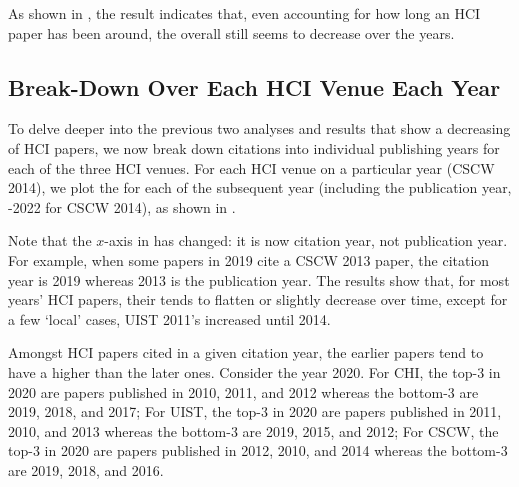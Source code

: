 As shown in , the result indicates that, even accounting for how long an HCI paper has been around, the overall \xin still seems to decrease over the years.


\subsection{\xin Break-Down Over Each HCI Venue Each Year}

To delve deeper into the previous two analyses and results that show a decreasing \xin of HCI papers, 
we now break down citations into individual publishing years for each of the three HCI venues.
For each HCI venue on a particular year (\eg CSCW 2014), we plot the \xin for each of the subsequent year (including the publication year, -2022 for CSCW 2014), as shown in .

Note that the $x$-axis in  has changed: it is now citation year, not publication year. For example, when some papers in 2019 cite a CSCW 2013 paper, the citation year is 2019 whereas 2013 is the publication year.
The results show that, for most years' HCI papers, their \xin tends to flatten or slightly decrease over time, except for a few `local' cases, \eg UIST 2011's \xin increased until 2014.

Amongst HCI papers cited in a given citation year, the earlier papers tend to have a higher \xin than the later ones. 
Consider the year 2020. 
For CHI, the top-3 \xin in 2020 are papers published in 2010, 2011, and 2012 whereas the bottom-3 are 2019, 2018, and 2017;
For UIST, the top-3 \xin in 2020 are papers published in 2011, 2010, and 2013 whereas the bottom-3 are 2019, 2015, and 2012;
For CSCW, the top-3 \xin in 2020 are papers published in 2012, 2010, and 2014 whereas the bottom-3 are 2019, 2018, and 2016.

